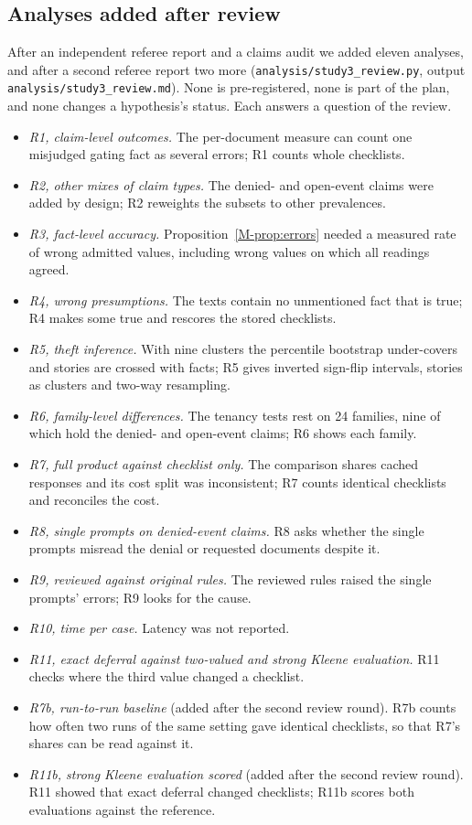 \subsection{Analyses added after review}
\label{app:review-analyses}
After an independent referee report and a claims audit we added eleven analyses, and after a second referee report two more (\texttt{analysis/\allowbreak{}study3\_\allowbreak{}review.py}, output \texttt{analysis/\allowbreak{}study3\_\allowbreak{}review.md}). None is pre-registered, none is part of the plan, and none changes a hypothesis's status. Each answers a question of the review.
\begin{itemize}[leftmargin=1.2em,itemsep=1pt]
\item \emph{R1, claim-level outcomes.} The per-document measure can count one misjudged gating fact as several errors; R1 counts whole checklists.
\item \emph{R2, other mixes of claim types.} The denied- and open-event claims were added by design; R2 reweights the subsets to other prevalences.
\item \emph{R3, fact-level accuracy.} Proposition~\ref{M-prop:errors} needed a measured rate of wrong admitted values, including wrong values on which all readings agreed.
\item \emph{R4, wrong presumptions.} The texts contain no unmentioned fact that is true; R4 makes some true and rescores the stored checklists.
\item \emph{R5, theft inference.} With nine clusters the percentile bootstrap under-covers and stories are crossed with facts; R5 gives inverted sign-flip intervals, stories as clusters and two-way resampling.
\item \emph{R6, family-level differences.} The tenancy tests rest on 24 families, nine of which hold the denied- and open-event claims; R6 shows each family.
\item \emph{R7, full product against checklist only.} The comparison shares cached responses and its cost split was inconsistent; R7 counts identical checklists and reconciles the cost.
\item \emph{R8, single prompts on denied-event claims.} R8 asks whether the single prompts misread the denial or requested documents despite it.
\item \emph{R9, reviewed against original rules.} The reviewed rules raised the single prompts' errors; R9 looks for the cause.
\item \emph{R10, time per case.} Latency was not reported.
\item \emph{R11, exact deferral against two-valued and strong Kleene evaluation.} R11 checks where the third value changed a checklist.
\item \emph{R7b, run-to-run baseline} (added after the second review round). R7b counts how often two runs of the same setting gave identical checklists, so that R7's shares can be read against it.
\item \emph{R11b, strong Kleene evaluation scored} (added after the second review round). R11 showed that exact deferral changed checklists; R11b scores both evaluations against the reference.
\end{itemize}

